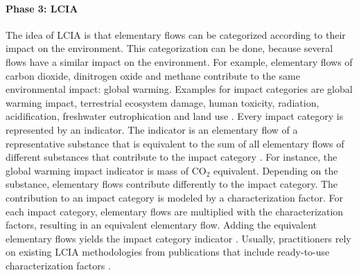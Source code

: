 \paragraph{Phase 3: \acl{LCIA}} The idea of \acf{LCIA} is that elementary flows can be categorized according to their impact on the environment.  This categorization can be done, because several flows have a similar impact on the environment. For example, elementary flows of carbon dioxide, dinitrogen oxide and methane contribute to the same environmental impact: global warming. Examples for impact categories are global warming impact, terrestrial ecosystem damage, human toxicity, radiation, acidification, freshwater eutrophication and land use  \cite{Huijbregts.2016}. Every impact category is represented by an indicator. The indicator is an elementary flow of a representative substance that is equivalent to the sum of all elementary flows of different substances that contribute to the impact category \cite{InternationalOrganizationforStandardization.2006b}. For instance, the global warming impact indicator is mass of CO$_2$ equivalent.
Depending on the substance, elementary flows contribute differently to the impact category. The contribution to an impact category is modeled by a characterization factor. For each impact category, elementary flows are multiplied with the characterization factors, resulting in an equivalent elementary flow. Adding the equivalent elementary flows yields the impact category indicator \cite{InternationalOrganizationforStandardization.2006b}.
Usually, practitioners rely on existing \ac{LCIA} methodologies from publications that include ready-to-use characterization factors \cite{InternationalOrganizationforStandardization.2006b}.

